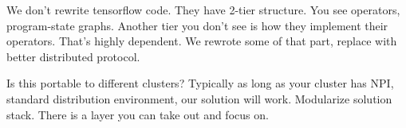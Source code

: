 We don't rewrite tensorflow code. They have 2-tier structure. You see operators, program-state graphs. Another tier you don't see is how they implement their operators. That's highly dependent. We rewrote some of that part, replace with better distributed protocol.

Is this portable to different clusters? Typically as long as your cluster has NPI, standard distribution environment, our solution will work. 
Modularize solution stack. There is a layer you can take out and focus on.

